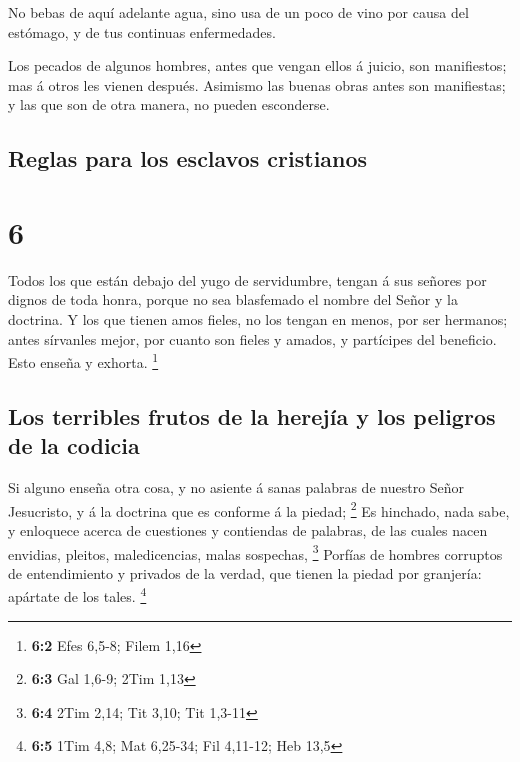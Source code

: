  No bebas de aquí adelante agua, sino usa de un poco de
vino por causa del estómago, y de tus continuas enfermedades.

 Los pecados de algunos hombres, antes que vengan ellos á
juicio, son manifiestos; mas á otros les vienen después. 
Asimismo las buenas obras antes son manifiestas; y las que son de otra
manera, no pueden esconderse.

\hypertarget{reglas-para-los-esclavos-cristianos}{%
\subsection{Reglas para los esclavos
cristianos}\label{reglas-para-los-esclavos-cristianos}}

\hypertarget{section-5}{%
\section{6}\label{section-5}}

 Todos los que están debajo del yugo de servidumbre, tengan
á sus señores por dignos de toda honra, porque no sea blasfemado el
nombre del Señor y la doctrina.  Y los que tienen amos
fieles, no los tengan en menos, por ser hermanos; antes sírvanles mejor,
por cuanto son fieles y amados, y partícipes del beneficio. Esto enseña
y exhorta. \footnote{\textbf{6:2} Efes 6,5-8; Filem 1,16}

\hypertarget{los-terribles-frutos-de-la-herejuxeda-y-los-peligros-de-la-codicia}{%
\subsection{Los terribles frutos de la herejía y los peligros de la
codicia}\label{los-terribles-frutos-de-la-herejuxeda-y-los-peligros-de-la-codicia}}

 Si alguno enseña otra cosa, y no asiente á sanas palabras
de nuestro Señor Jesucristo, y á la doctrina que es conforme á la
piedad; \footnote{\textbf{6:3} Gal 1,6-9; 2Tim 1,13}  Es
hinchado, nada sabe, y enloquece acerca de cuestiones y contiendas de
palabras, de las cuales nacen envidias, pleitos, maledicencias, malas
sospechas, \footnote{\textbf{6:4} 2Tim 2,14; Tit 3,10; Tit 1,3-11}
 Porfías de hombres corruptos de entendimiento y privados de
la verdad, que tienen la piedad por granjería: apártate de los tales.
\footnote{\textbf{6:5} 1Tim 4,8; Mat 6,25-34; Fil 4,11-12; Heb 13,5}

